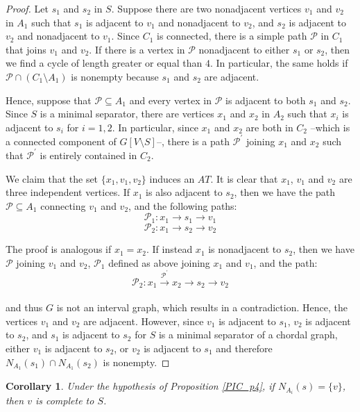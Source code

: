 \documentclass[12pt]{book}
\theoremstyle{plain}
\newtheorem{cor}[teo]{Corollary}
\theoremstyle{remark}
\begin{document}
\begin{proof} 
	Let $s_1$ and $s_2$ in $S$. Suppose there are two nonadjacent vertices $v_1$ and $v_2$ in $A_1$ such that $s_1$ is adjacent to $v_1$ and nonadjacent to $v_2$, and $s_2$ is adjacent to $v_2$ and nonadjacent to $v_1$. 
	Since $C_1$ is connected, there is a simple path $\mathcal{P}$ in $C_1$ that joins $v_1$ and $v_2$.
If there is a vertex in $\mathcal{P}$ nonadjacent to either $s_1$ or $s_2$, then we find a cycle of length greater or equal than $4$. In particular, the same holds if $\mathcal{P} \cap (C_1 \setminus A_1)$ is nonempty because $s_1$ and $s_2$ are adjacent. 
	
	Hence, suppose that $\mathcal{P} \subseteq A_1$ and every vertex in $\mathcal{P}$ is adjacent to both $s_1$ and $s_2$.
Since $S$ is a minimal separator, there are vertices $x_1$ and $x_2$ in $A_2$ such that $x_i$ is adjacent to $s_i$ for $i=1,2$.
	In particular, since $x_1$ and $x_2$ are both in $C_2$ --which is a connected component of $G\left[ V\setminus S \right]$--, there is a path $\mathcal{P}^{'}$ joining $x_1$ and $x_2$ such that $\mathcal{P}^{'}$ is entirely contained in $C_2$.
	
	We claim that the set $\{x_1, v_1, v_2 \}$ induces an $AT$. It is clear that $x_1$, $v_1$ and $v_2$ are three independent vertices.
	If $x_1$ is also adjacent to $s_2$, then we have the path $\mathcal{P} \subseteq A_1$ connecting $v_1$ and $v_2$, and the following paths: 
	$$ \mathcal{P}_1 : x_1 \rightarrow s_1 \rightarrow v_1 $$ 
	$$\mathcal{P}_2 : x_1 \rightarrow s_2 \rightarrow v_2 $$ 
 
	The proof is analogous if $x_1 = x_2$. If instead $x_1$ is nonadjacent to $s_2$, then we have $\mathcal{P}$ joining $v_1$ and $v_2$, 
	$\mathcal{P}_1$ defined as above joining $x_1$ and $v_1$, and the path:
	$$ \mathcal{P}_2 : x_1 \xrightarrow[]{\mathcal{P}^{'}} x_2 \rightarrow s_2 \rightarrow v_2 $$ 	
 	
 	and thus $G$ is not an interval graph, which results in a contradiction. Hence, the vertices $v_1$ and $v_2$ are adjacent.
	However, since $v_1$ is adjacent to $s_1$, $v_2$ is adjacent to $s_2$, and $s_1$ is adjacent to $s_2$ for $S$ is a minimal separator of a chordal graph, either $v_1$ is adjacent to $s_2$, or $v_2$ is adjacent to $s_1$ and therefore $N_{A_1} (s_1) \cap N_{A_1} (s_2)$ is nonempty.
\end{proof}

\begin{cor}
	Under the hypothesis of Proposition \ref{PIC_p4}, if $N_{A_i} (s) = \{ v \}$, then $v$ is complete to $S$.
\end{cor}
\end{document}
